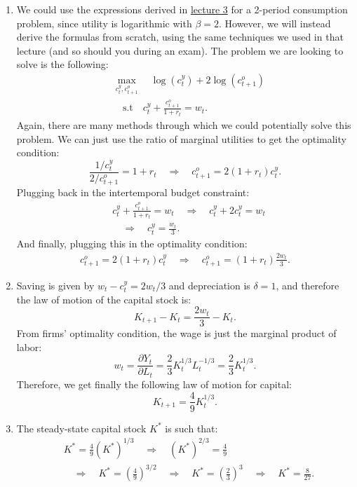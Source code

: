 \documentclass[]{book}
\begin{document}
\begin{enumerate}
\def\labelenumi{\arabic{enumi}.}
\item
  We could use the expressions derived in
  \protect\hyperlink{two-period}{lecture 3} for a 2-period consumption
  problem, since utility is logarithmic with \(\beta = 2\). However, we
  will instead derive the formulas from scratch, using the same
  techniques we used in that lecture (and so should you during an exam).
  The problem we are looking to solve is the following: \[
  \begin{aligned}
  & \max_{c_t^y, c_{t+1}^o} \quad \log(c_t^y) + 2\log(c_{t+1}^o)\\
  & \quad \text{s.t} \quad c_{t}^{y}+\frac{c_{t+1}^{o}}{1+r_t}=w_{t}.
  \end{aligned}
  \] Again, there are many methods through which we could potentially
  solve this problem. We can just use the ratio of marginal utilities to
  get the optimality condition:
  \[\frac{1/c_t^y}{2/c_{t+1}^o}=1+r_t \quad \Rightarrow \quad c_{t+1}^o = 2(1+r_t)c_t^y.\]
  Plugging back in the intertemporal budget constraint: \[
  \begin{aligned}
  &c_{t}^{y}+\frac{c_{t+1}^{o}}{1+r_t}=w_{t} \quad \Rightarrow \quad c_t^y + 2 c_t^y = w_t\\
  &\quad \Rightarrow \quad \boxed{c_t^y = \frac{w_t}{3}}.
  \end{aligned}
  \] And finally, plugging this in the optimality condition: \[
  \begin{aligned}
  c_{t+1}^o = 2(1+r_t)c_t^y \quad \Rightarrow \quad \boxed{c_{t+1}^o = (1+r_t)\frac{2w_t}{3}}.
  \end{aligned}
  \]
\item
  Saving is given by \(w_t - c_t^y = 2w_t/3\) and depreciation is
  \(\delta = 1\), and therefore the law of motion of the capital stock
  is: \[K_{t+1} - K_t = \frac{2w_t}{3}-K_t.\] From firms' optimality
  condition, the wage is just the marginal product of labor:
  \[w_{t}=\frac{\partial Y_{t}}{\partial L_{t}}=\frac{2}{3}K_{t}^{1/3}L_{t}^{-1/3}=\frac{2}{3}K_{t}^{1/3}.\]
  Therefore, we get finally the following law of motion for capital:
  \[K_{t+1} = \frac{4}{9}K_{t}^{1/3}.\]
\item
  The steady-state capital stock \(K^{*}\) is such that: \[
  \begin{aligned}
  & K^{*} = \frac{4}{9}(K^{*})^{1/3} \quad \Rightarrow \quad (K^{*})^{2/3} = \frac{4}{9}\\
  & \quad \Rightarrow \quad K^{*} = \left(\frac{4}{9}\right)^{3/2} \quad \Rightarrow \quad K^{*} = \left(\frac{2}{3}\right)^{3} \quad \Rightarrow \quad \boxed{K^{*} = \frac{8}{27}}.

\end{aligned}\]
\end{enumerate}
\end{document}
